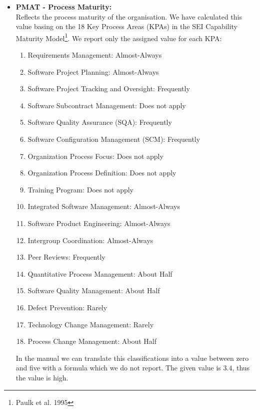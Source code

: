 \documentclass[\mainpath/main]{subfiles}
\begin{document}
\begin{itemize}
	\item \textbf{PMAT - Process Maturity:}\\
	Reflects the process maturity of the organisation. We have calculated this value basing on the 18 Key Process Areas (KPAs) in the SEI Capability Maturity Model\footnote{Paulk et al. 1995}. We report only the assigned value for each KPA:
	\begin{enumerate}
		\item Requirements Management: Almost-Always
		\item Software Project Planning: Almost-Always
		\item Software Project Tracking and Oversight: Frequently
		\item Software Subcontract Management: Does not apply
		\item Software Quality Assurance (SQA): Frequently
		\item Software Configuration Management (SCM): Frequently
		\item Organization Process Focus: Does not apply
		\item Organization Process Definition: Does not apply
		\item Training Program: Does not apply
		\item Integrated Software Management: Almost-Always
		\item Software Product Engineering: Almost-Always
		\item Intergroup Coordination: Almost-Always
		\item Peer Reviews: Frequently
		\item Quantitative Process Management: About Half
		\item Software Quality Management: About Half
		\item Defect Prevention: Rarely
		\item Technology Change Management: Rarely
		\item Process Change Management: About Half
	\end{enumerate}
	In the manual we can translate this classifications into a value between zero and five with a formula which we do not report. The given value is $3.4$, thus the value is high. 
	\\
\end{itemize}
\end{document}
